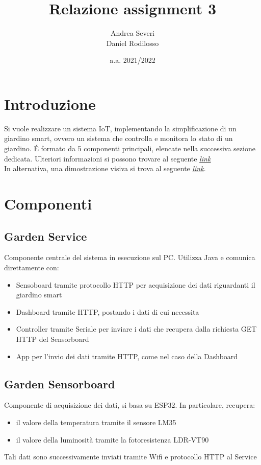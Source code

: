 \documentclass[a4paper, 12pt]{article}
\title{\textbf{Relazione assignment 3}}
\author{Andrea Severi\\Daniel Rodilosso}
\date{a.a. 2021/2022}
\begin{document}
\maketitle

\section{Introduzione}
Si vuole realizzare un sistema IoT, implementando la simplificazione di un giardino smart, ovvero un sistema che controlla e monitora lo stato di un giardino. \'E formato da 5 componenti principali, elencate nella successiva sezione dedicata. Ulteriori informazioni si possono trovare al seguente \href{https://docs.google.com/document/d/1oD8VSHPsmvpfgtXeALszZn8Bt9sD60pmsZQmUkinLm0/edit}{\underline{\emph{link}}}\\
In alternativa, una dimostrazione visiva si trova al seguente \href{https://liveunibo-my.sharepoint.com/:v:/g/personal/andrea_severi12_studio_unibo_it/Ebr-YQ9bWPhForXCmn0dCDIBFiw2Ak20UQRDlxhNdCWyyQ?e=LvFZex}{\underline{\emph{link}}}.

\section{Componenti}

\subsection{Garden Service}
Componente centrale del sistema in esecuzione sul PC. Utilizza Java e comunica direttamente con:
\begin{itemize}
    \item Sensoboard tramite protocollo HTTP per acquisizione dei dati riguardanti il
    giardino smart
    \item Dashboard tramite HTTP, postando i dati di cui necessita
    \item Controller tramite Seriale per inviare i dati che recupera dalla richiesta GET HTTP del Sensorboard
    \item App per l'invio dei dati tramite HTTP, come nel caso della Dashboard
\end{itemize}
\clearpage

\subsection{Garden Sensorboard}
Componente di acquisizione dei dati, si basa su ESP32. In particolare, recupera:
\begin{itemize}
    \item il valore della temperatura tramite il sensore LM35
    \item il valore della luminosità tramite la fotoresistenza LDR-VT90
\end{itemize}
Tali dati sono successivamente inviati tramite Wifi e protocollo HTTP al Service
\end{document}
